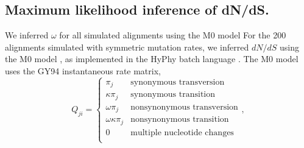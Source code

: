 \documentclass{pnastwo}
\begin{document}
\begin{article}
\subsection*{Maximum likelihood inference of dN/dS.}
We inferred $\omega$ for all simulated alignments using the M0 model 
For the 200 alignments simulated with symmetric mutation rates, we inferred $dN/dS$ using the M0 model \cite{Yangetal2000}, as implemented in the HyPhy batch language \cite{KosakovskyPondetal2005}. The M0 model uses the GY94 instantaneous rate matrix,
\begin{equation}\label{eq:GY94}
Q_{ji} = \left\{ 
	\begin{array}{rl}
	\pi_j                  &\mbox{synonymous transversion} \\
	\kappa \pi_j           &\mbox{synonymous transition} \\
 	\omega \pi_j           &\mbox{nonsynonymous transversion} \\
 	\omega \kappa \pi_j    &\mbox{nonsynonymous transition} \\
	0                      &\mbox{multiple nucleotide changes} \\             
	\end{array} \right.,
\end{equation}

\end{article}
\end{document}
